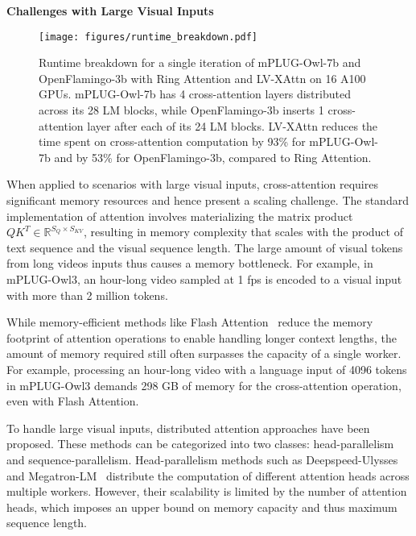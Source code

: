 \textbf{Challenges with Large Visual Inputs} 
\begin{figure}[t]
    \centering
    \texttt{[image: figures/runtime\_breakdown.pdf]}
    \caption{Runtime breakdown for a single iteration of mPLUG-Owl-7b and OpenFlamingo-3b with Ring Attention and LV-XAttn on 16 A100 GPUs. mPLUG-Owl-7b has 4 cross-attention layers distributed across its 28 LM blocks, while OpenFlamingo-3b inserts 1 cross-attention layer after each of its 24 LM blocks. LV-XAttn reduces the time spent on cross-attention computation by 93\% for mPLUG-Owl-7b and by 53\% for OpenFlamingo-3b, compared to Ring Attention.}
    \label{fig:runtime_breakdown}
    \vspace{-1ex}
\end{figure}
When applied to scenarios with large visual inputs, cross-attention requires significant memory resources and hence present a scaling challenge. The standard implementation of attention involves materializing the matrix product $QK^T \in \mathbb{R}^{S_Q \times S_{KV}}$, resulting in memory complexity that scales with the product of text sequence and the visual sequence length. The large amount of visual tokens from long videos inputs thus causes a memory bottleneck. For example, in mPLUG-Owl3, an hour-long video sampled at 1 fps is encoded to a visual input with more than 2 million tokens. 

While memory-efficient methods like Flash Attention~\cite{dao2022fa, dao2023fa2} reduce the memory footprint of attention operations to enable handling longer context lengths, the amount of memory required still often surpasses the capacity of a single worker. For example, processing an hour-long video with a language input of 4096 tokens in mPLUG-Owl3 demands 298 GB of memory for the cross-attention operation, even with Flash Attention.

To handle large visual inputs, distributed attention approaches have been proposed. These methods can be categorized into two classes: head-parallelism and sequence-parallelism. Head-parallelism methods such as Deepspeed-Ulysses~\cite{jacobs2024ds} and Megatron-LM~\cite{korthikanti2023megatron-lm} distribute the computation of different attention heads across multiple workers. However, their scalability is limited by the number of attention heads, which imposes an upper bound on memory capacity and thus maximum sequence length.

